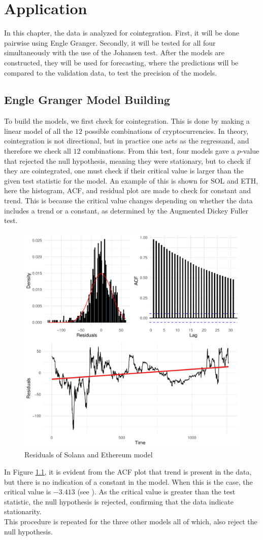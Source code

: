 \chapter{Application}
In this chapter, the data is analyzed for cointegration. First, it will be done pairwise using Engle Granger. Secondly, it will be tested for all four simultaneously with the use of the Johansen test. After the models are constructed, they will be used for forecasting, where the predictions will be compared to the validation data, to test the precision of the models.


\section{Engle Granger Model Building}
To build the models, we first check for cointegration. This is done by making a linear model of all the $12$ possible combinations of cryptocurrencies. In theory, cointegration is not directional, but in practice one acts as the regressand, and therefore we check all $12$ combinations. From this test, four models gave a $p$-value that rejected the null hypothesis, meaning they were stationary, but to check if they are cointegrated, one must check if their critical value is larger than the given test statistic for the model. An example of this is shown for SOL and ETH, here the histogram, ACF, and residual plot are made to check for constant and trend. This is because the critical value changes depending on whether the data includes a trend or a constant, as determined by the Augmented Dickey Fuller test. 
\begin{figure}[h]
    \centering
    \includegraphics[width=0.4\linewidth]{1.Projekt_kode/Billeder/plot_grid_ADF_Solana-Ethereum.pdf}
    \caption{Residuals of Solana and Ethereum model}
    \label{fig:ADF_HIST_GRAPH_SOLANA_ETHEREUM}
\end{figure}

\noindent In Figure \ref{fig:ADF_HIST_GRAPH_SOLANA_ETHEREUM}, it is evident from the ACF plot that trend is present in the data, but there is no indication of a constant in the model. When this is the case, the critical value is $-3.413$ (see \cite{ADf_crit_val}). As the critical value is greater than the test statistic, the null hypothesis is rejected, confirming that the data indicate stationarity. \\
\noindent This procedure is repeated for the three other models all of which, also reject the null hypothesis. 


